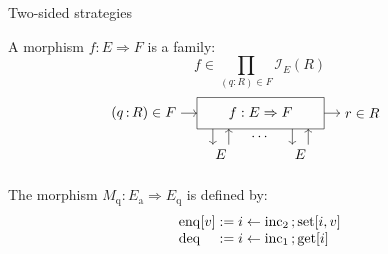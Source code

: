 \documentclass[aspectratio=141]{beamer}
\newcommand{\kw}[1]{\ensuremath{ \mathrm{#1} }}
\begin{document}
\begin{frame}{Two-sided strategies} %
  \begin{definition}
    A morphism $f : E \Rightarrow F$ is a family:
    \[
      f \in \prod_{(q : R) \in F} \mathcal{I}_E(R)
    \]
    \[
      \begin{tikzpicture}[scale=0.4]
        \draw[->] (-5,0) node[left] {$(q \mathop{:} R) \in F$} -- (-4,0);
        \draw (-4,-1) rectangle (4,1);
        \draw[->] (4,0) -- (5,0) node[right] {$r \in R$};
        \node (f) at (0,0) {$f : E \Rightarrow F$};
        \draw[->] (-3, -1) -- (-3, -2);
        \draw[->] (-2, -2) -- (-2, -1);
        \node[below] at (0, -1) {$\cdots$};
        \draw[->] (2, -1) -- (2, -2);
        \draw[->] (3, -2) -- (3, -1);
        \node[below] at (-2.5, -2) {$E$};
        \node[below] at ( 2.5, -2) {$E$};
      \end{tikzpicture}
      \qquad
    \]
  \end{definition}
  \pause
  \begin{example}
    The morphism $M_\kw{q} : E_\kw{a} \Rightarrow E_\kw{q}$ is defined by:
    \[
      \begin{array}{l@{}l}
        \kw{enq}[v] & {} :=
          i \leftarrow \kw{inc}_2 \mathop{;} \kw{set}[i, v] \\
        \kw{deq} & {} :=
          i \leftarrow \kw{inc}_1 \mathop{;} \kw{get}[i]
      \end{array}
    \]
  \end{example}
\end{frame}
\end{document}

